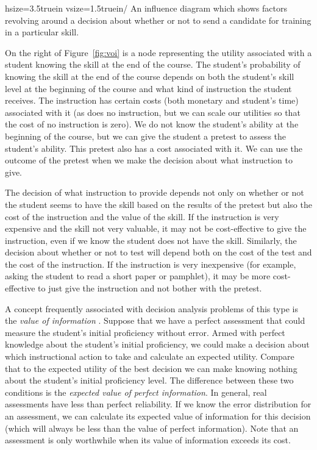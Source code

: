 \documentclass[12pt]{RR-article}
\begin{document}
hsize=3.5truein vsize=1.5truein/ An
influence diagram which shows factors revolving around a decision about
whether or not to send a candidate for training in a particular skill.

On the right of Figure~\ref{fig:voi} is a node representing the
utility associated with a student knowing the skill at the end of the
course.  The student's probability of knowing the skill at the end of
the course depends on both the student's skill level at the beginning
of the course and what kind of instruction the student receives.  The
instruction has certain costs (both monetary and student's time)
associated with it (as does no instruction, but we can scale our
utilities so that the cost of no instruction is zero).  We do not know
the student's ability at the beginning of the course, but we can give
the student a pretest to assess the student's ability.  This pretest
also has a cost associated with it.  We can use the outcome of the
pretest when we make the decision about what instruction to give.

The decision of what instruction to provide depends not only on
whether or not the student seems to have the skill based on the
results of the pretest but also the cost of the instruction and the
value of the skill.  If the instruction is very expensive and the
skill not very valuable, it may not be cost-effective to give the
instruction, even if we know the student does not have the skill.
Similarly, the decision about whether or not to test will depend both
on the cost of the test and the cost of the instruction.  If the
instruction is very inexpensive (for example, asking the student to
read a short paper or pamphlet), it may be more cost-effective to just
give the instruction and not bother with the pretest.

A concept frequently associated with decision analysis problems of
this type is the {\it{value of information}\/} \cite{Matheson1990}.
Suppose that we have a perfect assessment that could measure the
student's initial proficiency without error.  Armed with perfect
knowledge about the student's initial proficiency, we could make a
decision about which instructional action to take and calculate an
expected utility.  Compare that to the expected utility of the best
decision we can make knowing nothing about the student's initial
proficiency level.  The difference between these two conditions is the
\textit{expected value of perfect information}.  In general, real
assessments have less than perfect reliability.  If we know the error
distribution for an assessment, we can calculate its expected value of
information for this decision (which will always be less than the
value of perfect information).  Note that an assessment is only
worthwhile when its value of information exceeds its cost.
\end{document}
